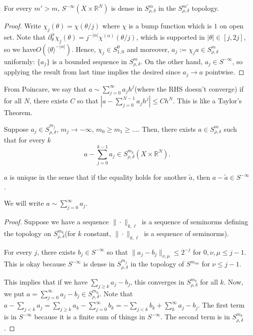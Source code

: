 \documentclass[12pt]{scrartcl}
\newcommand{\R}{\mathbb{R}}
\newcommand{\<}{\langle}
\renewcommand{\>}{\rangle}
\begin{document}
\begin{proposition} For every $m' > m$, $S^{-\infty}(X \times \R^N)$ is dense in $S_{\rho, \delta}^m$ in the $S^{m'}_{\rho, \delta}$ topology.
\end{proposition}
\begin{proof} Write $\chi_j(\theta) = \chi(\theta/j)$ where $\chi$ is a bump function which is $1$ on open set.  Note that $\partial_{\theta}^\alpha \chi_j(\theta) = j^{-|\alpha|} \chi^{(\alpha)}(\theta/j)$, which is supported in $|\theta| \in [j, 2j]$, so we have$O(\<\theta\>^{-|\alpha|})$.  Hence, $\chi_j \in S_{1,0}^0$ and moreover, $a_j := \chi_j a \in S^{m}_{\rho, \delta}$ uniformly: $\{a_j\}$ is a bounded sequence in $S_{\rho, \delta}^m$.  On the other hand, $a_j \in S^{-\infty}$, so applying the result from last time implies the desired since $a_j \to a$ pointwise.  

\end{proof}
\begin{remark} From Poincare, we say that $a \sim \sum_{j=0}^\infty a_j h^j$(where the RHS doesn't converge) if for all $N$, there exists $C$ so that $|a - \sum_{j=0}^{N-1} a_jh^j| \le Ch^N$.  This is like a Taylor's Theorem.  
\end{remark}
\begin{theorem}
Suppose $a_j \in S_{\rho, \delta}^{m_j}$, $m_j \to -\infty$, $m_0 \ge m_1 \ge \dots$.  Then, there exists $a \in S^m_{\rho,\delta}$ such that for every $k$
$$a - \sum_{j=0}^{k-1} a_j \in S_{\rho, \delta}^{m_k}(X \times \R^N).$$

$a$ is unique in the sense that if the equality holds for another $\tilde{a}$, then $a - \tilde{a} \in S^{-\infty}$.
\end{theorem} 
We will write $a \sim \sum_{j=0}^\infty a_j$.
\begin{proof}
Suppose we have a sequence $\|\cdot\|_{k, \ell}$ is a sequence of seminorms defining the topology on $S_{\rho, \delta}^{m_k}$(for $k$ constant, $\|\cdot\|_{k, \ell}$ is a sequence of seminorms).  

For every $j$, there exists $b_j \in S^{-\infty}$ so that $\|a_j - b_j\|_{\nu, \mu}\le 2^{-j}$ for $0, \nu, \mu \le j-1$.  This is okay because $S^{-\infty}$ is dense in $S^{m_j}_{\rho, \delta}$ in the topology of $S^{m_{nu}}$ for $\nu \le j-1$.  

This implies that if we have $\sum_{j \ge k} a_j - b_j$, this converges in $S^{m_k}_{\rho, \delta}$ for all $k$.  Now, we put $a = \sum_{j=0}^\infty a_j - b_j \in S_{\rho, \delta}^{m_0}$.  Note that $a - \sum_{j < k} a_j = \sum_{j\ge k} a_k - \sum_{j=0}^\infty b_k = -\sum_{j < k} b_k + \sum_{k}^\infty a_j - b_j$.  The first term is in $S^{-\infty}$ because it is a finite sum of things in $S^{-\infty}$.  The second term is in $S_{\rho, \delta}^{m_0}$.
\end{proof} 
\end{document}
